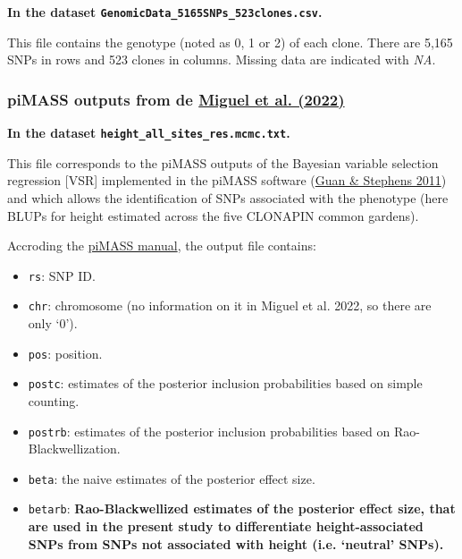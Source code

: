 \documentclass[]{article}
\providecommand{\tightlist}{%
  \setlength{\itemsep}{0pt}\setlength{\parskip}{0pt}}
\begin{document}
\textbf{In the dataset \texttt{GenomicData\_5165SNPs\_523clones.csv}.}

This file contains the genotype (noted as 0, 1 or 2) of each clone.
There are 5,165 SNPs in rows and 523 clones in columns. Missing data are
indicated with \emph{NA}.

\subsubsection{\texorpdfstring{piMASS outputs from de
\href{https://onlinelibrary.wiley.com/doi/full/10.1111/mec.16367?casa_token=1nNTc88Iy40AAAAA\%3ALd4EOK5ehk_cEHIkw5A9l8nk0NPzUzlYPX8eAjVCikIjHP0WJ1kxoHJSZjMLFsZcP-8wdbNuNrlOfp1jzw}{Miguel
et al.
(2022)}}{piMASS outputs from de Miguel et al. (2022)}}\label{pimass-outputs-from-de-miguel-et-al.-2022}

\textbf{In the dataset \texttt{height\_all\_sites\_res.mcmc.txt}.}

This file corresponds to the piMASS outputs of the Bayesian variable
selection regression {[}VSR{]} implemented in the piMASS software
(\href{https://projecteuclid.org/journals/annals-of-applied-statistics/volume-5/issue-3/Bayesian-variable-selection-regression-for-genome-wide-association-studies-and/10.1214/11-AOAS455.full}{Guan
\& Stephens 2011}) and which allows the identification of SNPs
associated with the phenotype (here BLUPs for height estimated across
the five CLONAPIN common gardens).

Accroding the
\href{https://www.haplotype.org/download/pimass-manual.pdf}{piMASS
manual}, the output file contains:

\begin{itemize}
\tightlist
\item
  \texttt{rs}: SNP ID.
\item
  \texttt{chr}: chromosome (no information on it in Miguel et al. 2022,
  so there are only `0').
\item
  \texttt{pos}: position.
\item
  \texttt{postc}: estimates of the posterior inclusion probabilities
  based on simple counting.
\item
  \texttt{postrb}: estimates of the posterior inclusion probabilities
  based on Rao-Blackwellization.
\item
  \texttt{beta}: the naive estimates of the posterior effect size.
\item
  \texttt{betarb}: \textbf{Rao-Blackwellized estimates of the posterior
  effect size, that are used in the present study to differentiate
  height-associated SNPs from SNPs not associated with height (i.e.
  `neutral' SNPs).}
\end{itemize}
\end{document}
